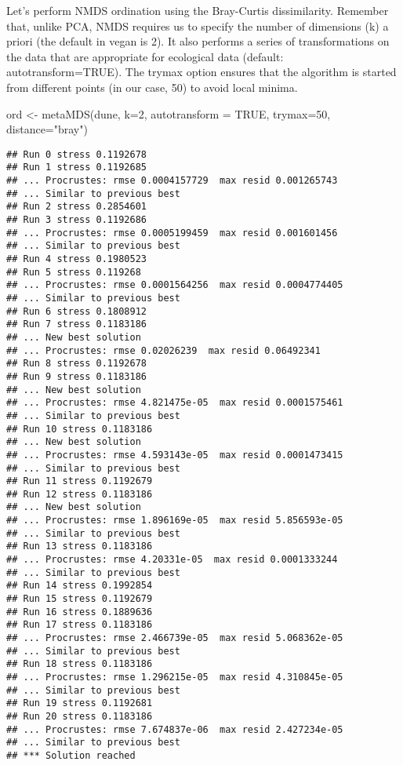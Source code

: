 \documentclass[
]{book}
\newenvironment{Shaded}{\begin{snugshade}}{\end{snugshade}}
\newcommand{\AttributeTok}[1]{\textcolor[rgb]{0.77,0.63,0.00}{#1}}
\newcommand{\ConstantTok}[1]{\textcolor[rgb]{0.00,0.00,0.00}{#1}}
\newcommand{\DecValTok}[1]{\textcolor[rgb]{0.00,0.00,0.81}{#1}}
\newcommand{\FunctionTok}[1]{\textcolor[rgb]{0.00,0.00,0.00}{#1}}
\newcommand{\NormalTok}[1]{#1}
\newcommand{\OtherTok}[1]{\textcolor[rgb]{0.56,0.35,0.01}{#1}}
\newcommand{\StringTok}[1]{\textcolor[rgb]{0.31,0.60,0.02}{#1}}
\begin{document}
Let's perform NMDS ordination using the Bray-Curtis dissimilarity. Remember that, unlike PCA, NMDS requires us to specify the number of dimensions (k) a priori (the default in vegan is 2). It also performs a series of transformations on the data that are appropriate for ecological data (default: autotransform=TRUE). The trymax option ensures that the algorithm is started from different points (in our case, 50) to avoid local minima.

\begin{Shaded}
\begin{Highlighting}[]
\NormalTok{ord }\OtherTok{\textless{}{-}} \FunctionTok{metaMDS}\NormalTok{(dune, }\AttributeTok{k=}\DecValTok{2}\NormalTok{, }\AttributeTok{autotransform =} \ConstantTok{TRUE}\NormalTok{, }\AttributeTok{trymax=}\DecValTok{50}\NormalTok{, }\AttributeTok{distance=}\StringTok{"bray"}\NormalTok{)}
\end{Highlighting}
\end{Shaded}

\begin{verbatim}
## Run 0 stress 0.1192678 
## Run 1 stress 0.1192685 
## ... Procrustes: rmse 0.0004157729  max resid 0.001265743 
## ... Similar to previous best
## Run 2 stress 0.2854601 
## Run 3 stress 0.1192686 
## ... Procrustes: rmse 0.0005199459  max resid 0.001601456 
## ... Similar to previous best
## Run 4 stress 0.1980523 
## Run 5 stress 0.119268 
## ... Procrustes: rmse 0.0001564256  max resid 0.0004774405 
## ... Similar to previous best
## Run 6 stress 0.1808912 
## Run 7 stress 0.1183186 
## ... New best solution
## ... Procrustes: rmse 0.02026239  max resid 0.06492341 
## Run 8 stress 0.1192678 
## Run 9 stress 0.1183186 
## ... New best solution
## ... Procrustes: rmse 4.821475e-05  max resid 0.0001575461 
## ... Similar to previous best
## Run 10 stress 0.1183186 
## ... New best solution
## ... Procrustes: rmse 4.593143e-05  max resid 0.0001473415 
## ... Similar to previous best
## Run 11 stress 0.1192679 
## Run 12 stress 0.1183186 
## ... New best solution
## ... Procrustes: rmse 1.896169e-05  max resid 5.856593e-05 
## ... Similar to previous best
## Run 13 stress 0.1183186 
## ... Procrustes: rmse 4.20331e-05  max resid 0.0001333244 
## ... Similar to previous best
## Run 14 stress 0.1992854 
## Run 15 stress 0.1192679 
## Run 16 stress 0.1889636 
## Run 17 stress 0.1183186 
## ... Procrustes: rmse 2.466739e-05  max resid 5.068362e-05 
## ... Similar to previous best
## Run 18 stress 0.1183186 
## ... Procrustes: rmse 1.296215e-05  max resid 4.310845e-05 
## ... Similar to previous best
## Run 19 stress 0.1192681 
## Run 20 stress 0.1183186 
## ... Procrustes: rmse 7.674837e-06  max resid 2.427234e-05 
## ... Similar to previous best
## *** Solution reached
\end{verbatim}
\end{document}
